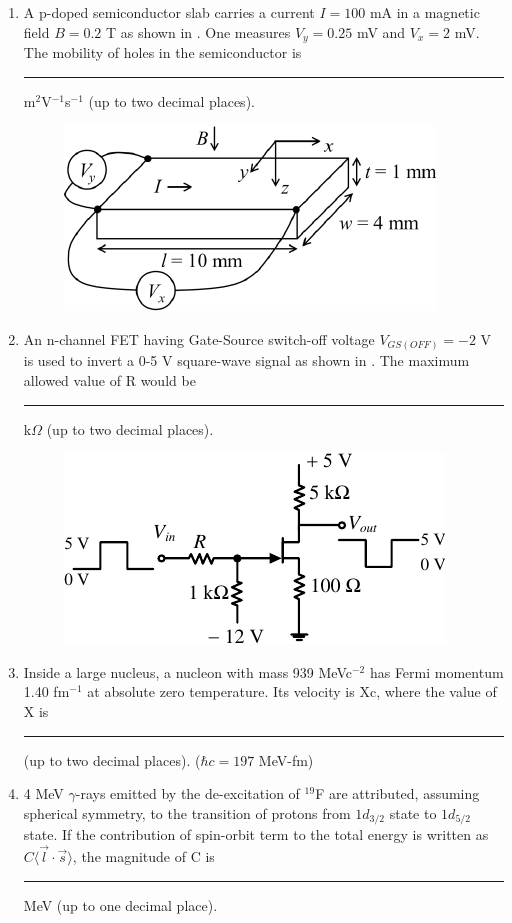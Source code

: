 \documentclass[journal,12pt,onecolumn]{IEEEtran}
\theoremstyle{remark}
\begin{document}
\begin{enumerate}
    \item A p-doped semiconductor slab carries a current $I = 100$ mA in a magnetic field $B=0.2$ T as shown in . One measures $V_y = 0.25$ mV and $V_x = 2$ mV. The mobility of holes in the semiconductor is \rule{1.5cm}{0.4pt} m$^2$V$^{-1}$s$^{-1}$ (up to two decimal places).
    \begin{figure}[H]
        \centering
        \caption{} \label{fig:48} \includegraphics{figs/48.png}
    \end{figure}\hfill{}

    \item An n-channel FET having Gate-Source switch-off voltage $V_{GS(OFF)} = -2$ V is used to invert a 0-5 V square-wave signal as shown in . The maximum allowed value of R would be \rule{1.5cm}{0.4pt} k$\Omega$ (up to two decimal places).
    \begin{figure}[H]
        \centering
        \caption{} \label{fig:49} \includegraphics{figs/49.png}
    \end{figure}\hfill{}

    \item Inside a large nucleus, a nucleon with mass 939 MeVc$^{-2}$ has Fermi momentum 1.40 fm$^{-1}$ at absolute zero temperature. Its velocity is Xc, where the value of X is \rule{1.5cm}{0.4pt} (up to two decimal places). ($\hbar c = 197$ MeV-fm)\hfill{}

    \item 4 MeV $\gamma$-rays emitted by the de-excitation of $^{19}$F are attributed, assuming spherical symmetry, to the transition of protons from $1d_{3/2}$ state to $1d_{5/2}$ state. If the contribution of spin-orbit term to the total energy is written as $C\langle\vec{l} \cdot \vec{s}\rangle$, the magnitude of C is \rule{1.5cm}{0.4pt} MeV (up to one decimal place).\hfill{}


\end{enumerate}
\end{document}
